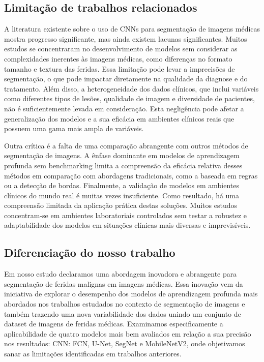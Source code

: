 \subsection{Limitação de trabalhos relacionados}

    A literatura existente sobre o uso de \ac{CNNs} para segmentação de imagens médicas mostra progresso significante, mas ainda existem lacunas significantes. Muitos estudos se concentraram no desenvolvimento de modelos sem considerar as complexidades inerentes às imagens médicas, como diferenças no formato tamanho e textura das feridas. Essa limitação pode levar a imprecisões de segmentação, o que pode impactar diretamente na qualidade da diagnose e do tratamento. Além disso, a heterogeneidade dos dados clínicos, que inclui variáveis como diferentes tipos de lesões, qualidade de imagem e diversidade de pacientes, não é suficientemente levada em consideração. Esta negligência pode afetar a generalização dos modelos e a sua eficácia em ambientes clínicos reais que possuem uma gama mais ampla de variáveis.

    Outra crítica é a falta de uma comparação abrangente com outros métodos de segmentação de imagens. A ênfase dominante em modelos de aprendizagem profunda sem benchmarking limita a compreensão da eficácia relativa desses métodos em comparação com abordagens tradicionais, como a baseada em regras ou a detecção de bordas. Finalmente, a validação de modelos em ambientes clínicos do mundo real é muitas vezes insuficiente. Como resultado, há uma compreensão limitada da aplicação prática destas soluções. Muitos estudos concentram-se em ambientes laboratoriais controlados sem testar a robustez e adaptabilidade dos modelos em situações clínicas mais diversas e imprevisíveis.

\subsection{Diferenciação do nosso trabalho} 

    Em nosso estudo declaramos uma abordagem inovadora e abrangente para segmentação de feridas malignas em imagens médicas. Essa inovação vem da iniciativa de explorar o desempenho dos modelos de aprendizagem profunda mais abordados nos trabalhos estudados no contexto de segmentação de imagens e também trazendo uma nova variabilidade dos dados unindo um conjunto de dataset de  imagens de feridas médicas. Examinamos especificamente a aplicabilidade de quatro modelos mais bem avaliados em relação a sua precisão nos resultados: \ac{CNN}: \ac{FCN}, \ac{U-Net}, \ac{SegNet} e \ac{MobileNetV2}, onde objetivamos sanar as limitações identificadas em trabalhos anteriores.

